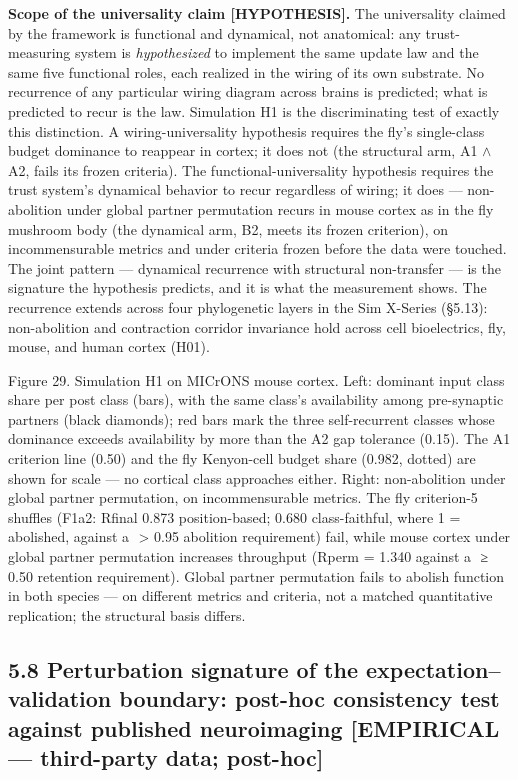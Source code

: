 \documentclass[
]{article}
\begin{document}
\textbf{Scope of the universality claim {[}HYPOTHESIS{]}.} The
universality claimed by the framework is functional and dynamical, not
anatomical: any trust-measuring system is \emph{hypothesized} to
implement the same update law and the same five functional roles, each
realized in the wiring of its own substrate. No recurrence of any
particular wiring diagram across brains is predicted; what is predicted
to recur is the law. Simulation H1 is the discriminating test of exactly
this distinction. A wiring-universality hypothesis requires the fly's
single-class budget dominance to reappear in cortex; it does not (the
structural arm, A1 \(\wedge\) A2, fails its frozen criteria). The
functional-universality hypothesis requires the trust system's dynamical
behavior to recur regardless of wiring; it does --- non-abolition under
global partner permutation recurs in mouse cortex as in the fly mushroom
body (the dynamical arm, B2, meets its frozen criterion), on
incommensurable metrics and under criteria frozen before the data were
touched. The joint pattern --- dynamical recurrence with structural
non-transfer --- is the signature the hypothesis predicts, and it is
what the measurement shows. The recurrence extends across four
phylogenetic layers in the Sim X-Series (§5.13): non-abolition and
contraction corridor invariance hold across cell bioelectrics, fly,
mouse, and human cortex (H01).

Figure 29. Simulation H1 on MICrONS mouse cortex. Left: dominant input
class share per post class (bars), with the same class's availability
among pre-synaptic partners (black diamonds); red bars mark the three
self-recurrent classes whose dominance exceeds availability by more than
the A2 gap tolerance (0.15). The A1 criterion line (0.50) and the fly
Kenyon-cell budget share (0.982, dotted) are shown for scale --- no
cortical class approaches either. Right: non-abolition under global
partner permutation, on incommensurable metrics. The fly criterion-5
shuffles (F1a2: {Rfinal} 0.873 position-based; 0.680 class-faithful,
where 1 = abolished, against a { \textgreater{} 0.95} abolition
requirement) fail, while mouse cortex under global partner permutation
increases throughput ({Rperm = 1.340} against a { ≥ 0.50} retention
requirement). Global partner permutation fails to abolish function in
both species --- on different metrics and criteria, not a matched
quantitative replication; the structural basis differs.

\subsection{5.8 Perturbation signature of the expectation--validation
boundary: post-hoc consistency test against published neuroimaging
{[}EMPIRICAL --- third-party data;
post-hoc{]}}\label{perturbation-signature-of-the-expectationvalidation-boundary-post-hoc-consistency-test-against-published-neuroimaging-empirical-third-party-data-post-hoc}
\end{document}
